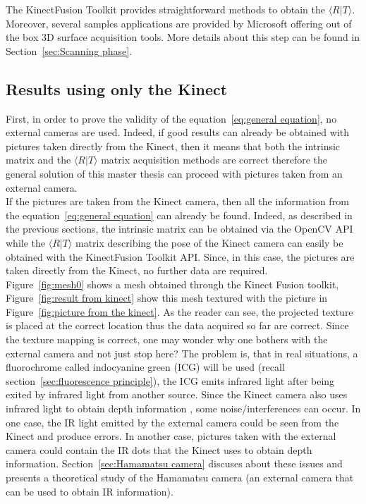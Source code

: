 The KinectFusion Toolkit provides straightforward methods to obtain the $\langle R\vert T\rangle$. Moreover, several samples applications are provided by Microsoft offering out of the box 3D surface acquisition tools. More details about this step can be found in Section~\ref{sec:Scanning phase}.

\subsection{Results using only the Kinect}
\label{sec:Results using only the Kinect}

First, in order to prove the validity of the equation~\ref{eq:general equation}, no external cameras are used. Indeed, if good results can already be obtained with pictures taken directly from the Kinect, then it means that both the intrinsic matrix and the $\langle R\vert T\rangle$ matrix acquisition methods are correct therefore the general solution of this master thesis can proceed with pictures taken from an external camera.\\

If the pictures are taken from the Kinect camera, then all the information from the equation~\ref{eq:general equation} can already be found. Indeed, as described in the previous sections, the intrinsic matrix can be obtained via the OpenCV API while the $\langle R\vert T\rangle$ matrix describing the pose of the Kinect camera can easily be obtained with the KinectFusion Toolkit API. Since, in this case, the pictures are taken directly from the Kinect, no further data are required. \\

Figure~\ref{fig:mesh0} shows a mesh obtained through the Kinect Fusion toolkit, Figure~\ref{fig:result from kinect} show this mesh textured with the picture in Figure~\ref{fig:picture from the kinect}. As the reader can see, the projected texture is placed at the correct location thus the data acquired so far are correct. Since the texture mapping is correct, one may wonder why one bothers with the external camera and not just stop here? The problem is, that in real situations, a fluorochrome called indocyanine green (ICG) will be used (recall section~\ref{sec:fluorescence principle}), the ICG emits infrared light after being exited by infrared light from another source. Since the Kinect camera also uses infrared light to obtain depth information \cite{freedman_depth_2008}, some noise/interferences can occur. In one case, the IR light emitted by the external camera could be seen from the Kinect and produce errors. In another case, pictures taken with the external camera could contain the IR dots that the Kinect uses to obtain depth information.  Section~\ref{sec:Hamamatsu camera} discuses about these issues and presents a theoretical study of the Hamamatsu camera (an external camera that can be used to obtain IR information). \\

